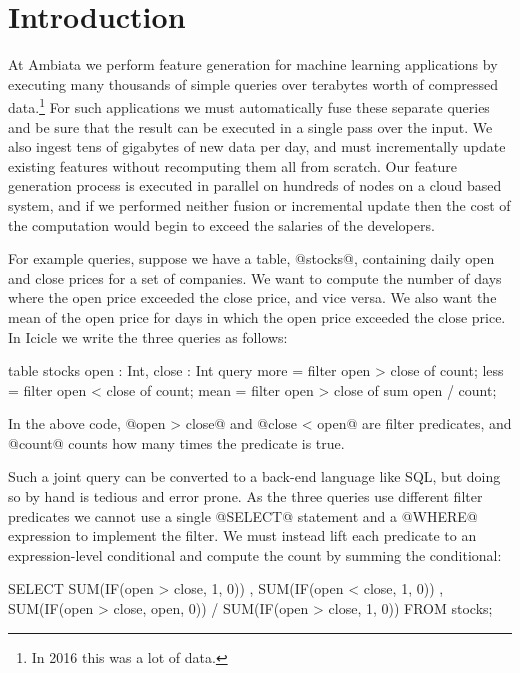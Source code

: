 \chapter{Introduction}
\label{icicle:s:Introduction}

At Ambiata we perform feature generation for machine learning applications by executing many thousands of simple queries over terabytes worth of compressed data.\footnote{In 2016 this was a lot of data.}
For such applications we must automatically fuse these separate queries and be sure that the result can be executed in a single pass over the input.
We also ingest tens of gigabytes of new data per day, and must incrementally update existing features without recomputing them all from scratch.
Our feature generation process is executed in parallel on hundreds of nodes on a cloud based system, and if we performed neither fusion or incremental update then the cost of the computation would begin to exceed the salaries of the developers.

For example queries, suppose we have a table, @stocks@, containing daily open and close prices for a set of companies. We want to compute the number of days where the open price exceeded the close price, and vice versa. We also want the mean of the open price for days in which the open price exceeded the close price. In Icicle we write the three queries as follows:

\begin{code}
table stocks { open : Int, close : Int }
query 
  more = filter open > close of count;
  less = filter open < close of count;
  mean = filter open > close of sum open / count;
\end{code}

In the above code, @open > close@ and @close < open@ are filter predicates, and @count@ counts how many times the predicate is true.

Such a joint query can be converted to a back-end language like SQL, but doing so by hand is tedious and error prone. As the three queries use different filter predicates we cannot use a single @SELECT@ statement and a @WHERE@ expression to implement the filter. We must instead lift each predicate to an expression-level conditional and compute the count by summing the conditional:
\begin{code}
  SELECT SUM(IF(open > close, 1,    0))
       , SUM(IF(open < close, 1,    0))
       , SUM(IF(open > close, open, 0))
       / SUM(IF(open > close, 1,    0))
  FROM stocks;
\end{code}

